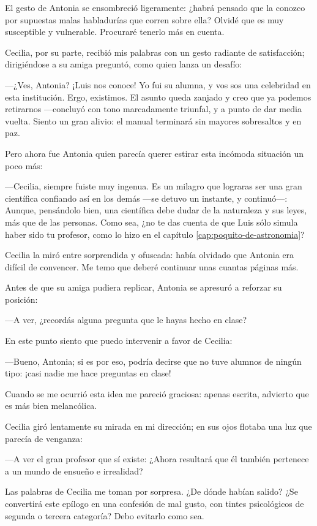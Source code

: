 El gesto de Antonia se ensombreció ligeramente: ¿habrá pensado que la
conozco por supuestas malas habladurías que corren sobre ella? Olvidé
que es muy susceptible y vulnerable. Procuraré tenerlo más en cuenta.

Cecilia, por su parte, recibió mis palabras con un gesto radiante de
satisfacción; dirigiéndose a su amiga preguntó, como quien lanza un
desafío:

---¿Ves, Antonia? ¡Luis nos conoce! Yo fui su alumna, y vos sos una
celebridad en esta institución. Ergo, existimos. El asunto queda
zanjado y creo que ya podemos retirarnos ---con\-clu\-yó con tono
marcadamente triunfal, y a punto de dar media vuelta. Siento un gran
alivio: el manual terminará sin mayores sobresaltos y en paz.

Pero ahora fue Antonia quien parecía querer estirar esta incómoda
situación un poco más:

---Cecilia, siempre fuiste muy ingenua. Es un milagro que lograras ser
una gran científica confiando así en los demás ---se detuvo un
instante, y continuó---: Aunque, pensándolo bien, una científica debe
dudar de la naturaleza y sus leyes, más que de las personas. Como sea,
¿no te das cuenta de que Luis sólo simula haber sido tu profesor, como
lo hizo en el capítulo \ref{cap:poquito-de-astronomia}?

Cecilia la miró entre sorprendida y ofuscada: había olvidado que
Antonia era difícil de convencer. Me temo que deberé continuar unas
cuantas páginas más.

Antes de que su amiga pudiera replicar, Antonia se apresuró a reforzar
su posición:

---A ver, ¿recordás alguna pregunta que le hayas hecho en clase?

En este punto siento que puedo intervenir a favor de Cecilia:

---Bueno, Antonia; si es por eso, podría decirse que no tuve alumnos
de ningún tipo: ¡casi nadie me hace preguntas en clase!

Cuando se me ocurrió esta idea me pareció graciosa: apenas escrita,
advierto que es más bien melancólica.

Cecilia giró lentamente su mirada en mi dirección; en sus ojos flotaba
una luz que parecía de venganza:

---A ver el gran profesor que sí existe: ¿Ahora resultará que él
también pertenece a un mundo de ensueño e irrealidad?

Las palabras de Cecilia me toman por sorpresa. ¿De dónde habían
salido? ¿Se convertirá este epílogo en una confesión de mal gusto, con
tintes psicológicos de segunda o tercera categoría? Debo evitarlo
como sea.


